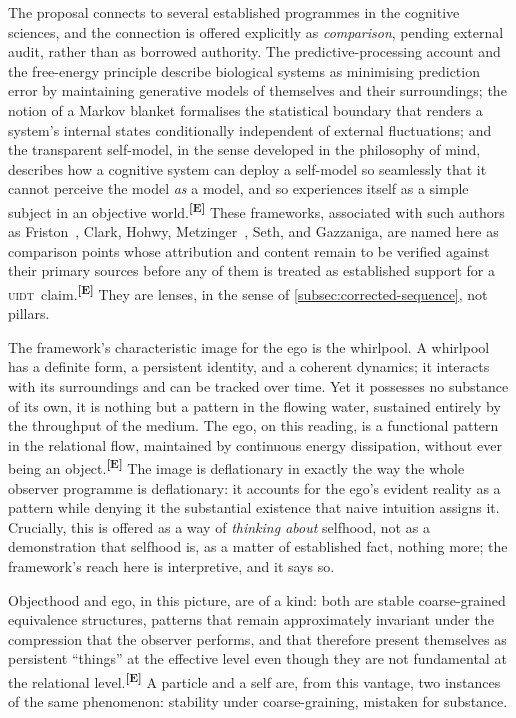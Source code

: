 \documentclass[12pt,a4paper,twoside]{article}
\theoremstyle{plain}
\theoremstyle{definition}
\theoremstyle{remark}
\newcommand{\UIDT}{\textsc{uidt}}
\newcommand{\catmark}[1]{\textsuperscript{\textsf{\textbf{[#1]}}}}
\begin{document}
The proposal connects to several established programmes in the cognitive sciences, and the connection is offered explicitly as \emph{comparison}, pending external audit, rather than as borrowed authority. The predictive-processing account and the free-energy principle describe biological systems as minimising prediction error by maintaining generative models of themselves and their surroundings; the notion of a Markov blanket formalises the statistical boundary that renders a system's internal states conditionally independent of external fluctuations; and the transparent self-model, in the sense developed in the philosophy of mind, describes how a cognitive system can deploy a self-model so seamlessly that it cannot perceive the model \emph{as} a model, and so experiences itself as a simple subject in an objective world.\catmark{E} These frameworks, associated with such authors as Friston~\cite{friston2010}, Clark, Hohwy, Metzinger~\cite{metzinger2003}, Seth, and Gazzaniga, are named here as comparison points whose attribution and content remain to be verified against their primary sources before any of them is treated as established support for a \UIDT\ claim.\catmark{E} They are lenses, in the sense of \cref{subsec:corrected-sequence}, not pillars.

The framework's characteristic image for the ego is the whirlpool. A whirlpool has a definite form, a persistent identity, and a coherent dynamics; it interacts with its surroundings and can be tracked over time. Yet it possesses no substance of its own, it is nothing but a pattern in the flowing water, sustained entirely by the throughput of the medium. The ego, on this reading, is a functional pattern in the relational flow, maintained by continuous energy dissipation, without ever being an object.\catmark{E} The image is deflationary in exactly the way the whole observer programme is deflationary: it accounts for the ego's evident reality as a pattern while denying it the substantial existence that naive intuition assigns it. Crucially, this is offered as a way of \emph{thinking about} selfhood, not as a demonstration that selfhood is, as a matter of established fact, nothing more; the framework's reach here is interpretive, and it says so.

Objecthood and ego, in this picture, are of a kind: both are stable coarse-grained equivalence structures, patterns that remain approximately invariant under the compression that the observer performs, and that therefore present themselves as persistent ``things'' at the effective level even though they are not fundamental at the relational level.\catmark{E} A particle and a self are, from this vantage, two instances of the same phenomenon: stability under coarse-graining, mistaken for substance.
\end{document}
